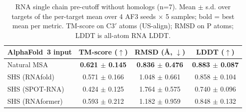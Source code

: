 \begin{table}[htbp]
\centering
\caption{RNA single chain pre-cutoff without homologs (n=7). Mean $\pm$ s.d. over targets of the per-target mean over 4 AF3 seeds $\times$ 5 samples; bold = best mean per metric. TM-score on C3$'$ atoms (US-align); RMSD on P atoms; LDDT is all-atom RNA LDDT.}
\label{tab:rna_single_chain_pre_cutoff_without_homologs}
\begin{tabular}{lccc}
\toprule
AlphaFold~3 input & TM-score ($\uparrow$) & RMSD (\AA, $\downarrow$) & LDDT ($\uparrow$) \\
\midrule
Natural MSA & \textbf{0.621 $\pm$ 0.145} & \textbf{0.836 $\pm$ 0.476} & \textbf{0.883 $\pm$ 0.087} \\
SHS (RNAfold) & 0.571 $\pm$ 0.166 & 1.048 $\pm$ 0.661 & 0.858 $\pm$ 0.104 \\
SHS (SPOT-RNA) & 0.424 $\pm$ 0.125 & 1.764 $\pm$ 0.575 & 0.740 $\pm$ 0.096 \\
SHS (RNAformer) & 0.593 $\pm$ 0.212 & 1.182 $\pm$ 0.959 & 0.848 $\pm$ 0.132 \\
\bottomrule
\end{tabular}
\end{table}
